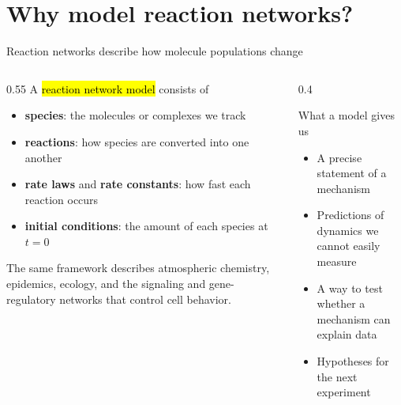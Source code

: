 \documentclass[aspectratio=169,10pt,t]{beamer}
\begin{document}
\section{Why model reaction networks?}

\begin{frame}{Reaction networks describe how molecule populations change}
  \begin{columns}[T]
    \begin{column}{0.55\textwidth}
      A \hl{reaction network model} consists of
      \begin{itemize}[<1->]
        \item<1-> \textbf{species}: the molecules or complexes we track
        \item<2-> \textbf{reactions}: how species are converted into one another
        \item<3-> \textbf{rate laws} and \textbf{rate constants}: how fast each reaction occurs
        \item<4-> \textbf{initial conditions}: the amount of each species at $t=0$
      \end{itemize}
      \vskip2mm
      The same framework describes atmospheric chemistry, epidemics, ecology,
      and the signaling and gene-regulatory networks that control cell behavior.
    \end{column}
    \begin{column}{0.4\textwidth}
      \begin{block}{What a model gives us}
        \small
        \begin{itemize}
          \item A precise statement of a mechanism
          \item Predictions of dynamics we cannot easily measure
          \item A way to test whether a mechanism can explain data
          \item Hypotheses for the next experiment
        \end{itemize}
      \end{block}
    \end{column}
  \end{columns}
\end{frame}
\end{document}
